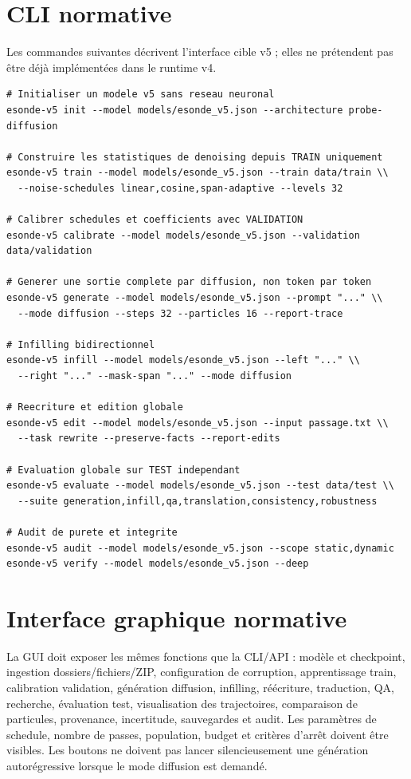\documentclass[11pt,a4paper,oneside]{report}
\begin{document}
\chapter{CLI normative}
Les commandes suivantes décrivent l'interface cible v5 ; elles ne prétendent pas être déjà implémentées dans le runtime v4.
\begin{lstlisting}[basicstyle=\ttfamily\small,breaklines=true,frame=single]
# Initialiser un modele v5 sans reseau neuronal
esonde-v5 init --model models/esonde_v5.json --architecture probe-diffusion

# Construire les statistiques de denoising depuis TRAIN uniquement
esonde-v5 train --model models/esonde_v5.json --train data/train \\
  --noise-schedules linear,cosine,span-adaptive --levels 32

# Calibrer schedules et coefficients avec VALIDATION
esonde-v5 calibrate --model models/esonde_v5.json --validation data/validation

# Generer une sortie complete par diffusion, non token par token
esonde-v5 generate --model models/esonde_v5.json --prompt "..." \\
  --mode diffusion --steps 32 --particles 16 --report-trace

# Infilling bidirectionnel
esonde-v5 infill --model models/esonde_v5.json --left "..." \\
  --right "..." --mask-span "..." --mode diffusion

# Reecriture et edition globale
esonde-v5 edit --model models/esonde_v5.json --input passage.txt \\
  --task rewrite --preserve-facts --report-edits

# Evaluation globale sur TEST independant
esonde-v5 evaluate --model models/esonde_v5.json --test data/test \\
  --suite generation,infill,qa,translation,consistency,robustness

# Audit de purete et integrite
esonde-v5 audit --model models/esonde_v5.json --scope static,dynamic
esonde-v5 verify --model models/esonde_v5.json --deep
\end{lstlisting}

\chapter{Interface graphique normative}
La GUI doit exposer les mêmes fonctions que la CLI/API : modèle et checkpoint, ingestion dossiers/fichiers/ZIP, configuration de corruption, apprentissage train, calibration validation, génération diffusion, infilling, réécriture, traduction, QA, recherche, évaluation test, visualisation des trajectoires, comparaison de particules, provenance, incertitude, sauvegardes et audit. Les paramètres de schedule, nombre de passes, population, budget et critères d'arrêt doivent être visibles. Les boutons ne doivent pas lancer silencieusement une génération autorégressive lorsque le mode diffusion est demandé.
\end{document}
